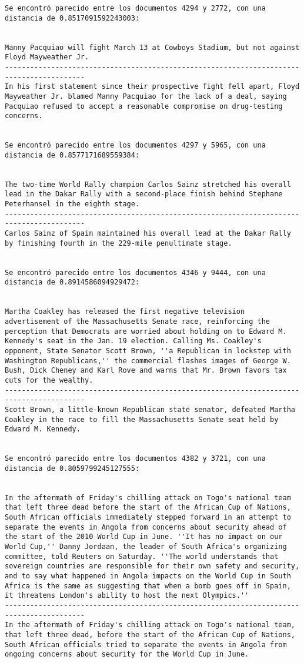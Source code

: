 \documentclass[11pt]{article}
\begin{document}
\begin{Verbatim}[commandchars=\\\{\}]
Se encontró parecido entre los documentos 4294 y 2772, con una distancia de 0.8517091592243003:


Manny Pacquiao will fight March 13 at Cowboys Stadium, but not against Floyd Mayweather Jr.
-----------------------------------------------------------------------------------------
In his first statement since their prospective fight fell apart, Floyd Mayweather Jr. blamed Manny Pacquiao for the lack of a deal, saying Pacquiao refused to accept a reasonable compromise on drug-testing concerns.


Se encontró parecido entre los documentos 4297 y 5965, con una distancia de 0.8577171689559384:


The two-time World Rally champion Carlos Sainz stretched his overall lead in the Dakar Rally with a second-place finish behind Stephane Peterhansel in the eighth stage.
-----------------------------------------------------------------------------------------
Carlos Sainz of Spain maintained his overall lead at the Dakar Rally by finishing fourth in the 229-mile penultimate stage.


Se encontró parecido entre los documentos 4346 y 9444, con una distancia de 0.8914586094929472:


Martha Coakley has released the first negative television advertisement of the Massachusetts Senate race, reinforcing the perception that Democrats are worried about holding on to Edward M. Kennedy's seat in the Jan. 19 election. Calling Ms. Coakley's opponent, State Senator Scott Brown, ''a Republican in lockstep with Washington Republicans,'' the commercial flashes images of George W. Bush, Dick Cheney and Karl Rove and warns that Mr. Brown favors tax cuts for the wealthy.
-----------------------------------------------------------------------------------------
Scott Brown, a little-known Republican state senator, defeated Martha Coakley in the race to fill the Massachusetts Senate seat held by Edward M. Kennedy.


Se encontró parecido entre los documentos 4382 y 3721, con una distancia de 0.8059799245127555:


In the aftermath of Friday's chilling attack on Togo's national team that left three dead before the start of the African Cup of Nations, South African officials immediately stepped forward in an attempt to separate the events in Angola from concerns about security ahead of the start of the 2010 World Cup in June. ''It has no impact on our World Cup,'' Danny Jordaan, the leader of South Africa's organizing committee, told Reuters on Saturday. ''The world understands that sovereign countries are responsible for their own safety and security, and to say what happened in Angola impacts on the World Cup in South Africa is the same as suggesting that when a bomb goes off in Spain, it threatens London's ability to host the next Olympics.''
-----------------------------------------------------------------------------------------
In the aftermath of Friday's chilling attack on Togo's national team, that left three dead, before the start of the African Cup of Nations, South African officials tried to separate the events in Angola from ongoing concerns about security for the World Cup in June.



\end{Verbatim}
\end{document}
